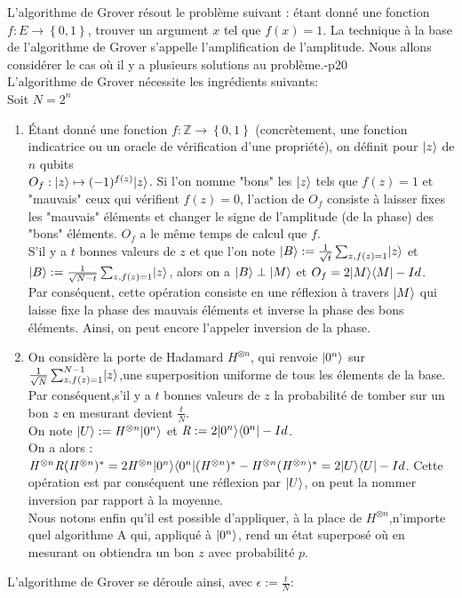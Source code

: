 \documentclass[12pt,openany]{report}
\DeclarePairedDelimiter\bra{\langle}{\rvert}
\DeclarePairedDelimiter\ket{\lvert}{\rangle}
\begin{document}
L’algorithme de Grover résout le problème suivant : étant donné une fonction
$f : E \rightarrow \left\lbrace 0, 1 \right\rbrace $, trouver un argument $x$ tel que $f(x) = 1$. La technique à la base
de l’algorithme de Grover s’appelle l’amplification de l’amplitude. Nous allons considérer le cas où il y a plusieurs solutions au problème.\cite{Ghazal}-p20\\
L'algorithme de Grover nécessite les ingrédients suivants:\\
Soit $ \mathit{N}=2^{n}  $
\begin{enumerate}
\item Étant donné une fonction $f : \mathbb{Z} \rightarrow \left\lbrace  0, 1\right\rbrace $ (concrètement, une fonction
indicatrice ou un oracle de vérification d’une propriété), on définit pour $ \ket{z} $ de $n$ qubits\\ $O_{f} : \ket{z} \mapsto(-1)^{f(z)}\ket{z}$. Si l’on nomme "bons" les $\ket{z}$
tels que $f(z) = 1$ et "mauvais" ceux qui vérifient $f(z) = 0$, l’action de $O_f$ consiste à laisser fixes les "mauvais" éléments et changer le signe de l’amplitude (de la phase) des "bons" éléments. $O_f$ a le même temps de calcul que $f$.\\
S'il y a $t$ bonnes valeurs de $z$ et que l'on note $ \ket{B}:=\frac{1}{\sqrt{t}} \sum_{z,f(z)=1}\ket{z} $ et $ \ket{B}:=\frac{1}{\sqrt{N-t}} \sum_{z,f(z)=1}\ket{z}$, alors on a 
$ \ket{B} \perp \ket{M} $ et $O_f=2\ket{M}\bra{M}-Id $.\\
Par conséquent, cette opération consiste en une réflexion à travers $\ket{M}$ qui laisse fixe la phase des mauvais éléments et inverse la phase des bons éléments. Ainsi, on peut encore l’appeler inversion de la phase.
\item On considère la porte de Hadamard $\mathit{H}^{\otimes n}  $, qui renvoie $\ket{0^n}  $ sur $ \frac{1}{\sqrt{N}} \sum_{z,f(z)=1}^{N-1}\ket{z} $,une superposition uniforme de tous les élements de la base. Par conséquent,s’il y a $t$ bonnes valeurs de $z$ la probabilité de tomber sur un bon $z$ en mesurant devient $ \frac{t}{N}$.\\
On note $\ket{U}:=\mathit{H}^{\otimes n} \ket{0^n} $ et $ \mathit{R}:=2\ket{0^n}\bra{0^n} - Id $.\\
On a alors :\\
$ \mathit{H}^{\otimes n} \mathit{R}(\mathit{H}^{\otimes n})^{*}=2\mathit{H}^{\otimes n}\ket{0^n}\bra{0^n}(\mathit{H}^{\otimes n})^{*}-\mathit{H}^{\otimes n}(\mathit{H}^{\otimes n})^{*}=2\ket{U}\bra{U}-Id $. Cette opération est par conséquent une réflexion par $\ket{U}$, on peut la nommer inversion par rapport à la moyenne.\\
Nous notons enfin qu’il est possible d’appliquer, à la place de $ \mathit{H}^{\otimes n} $,n’importe quel algorithme A qui, appliqué à $\ket{0^n} $, rend un état superposé où en mesurant on obtiendra un bon $z$ avec probabilité $p$.

 
\end{enumerate}
L’algorithme de Grover se déroule ainsi, avec $\epsilon :=\frac{t}{N} $:
\end{document}
